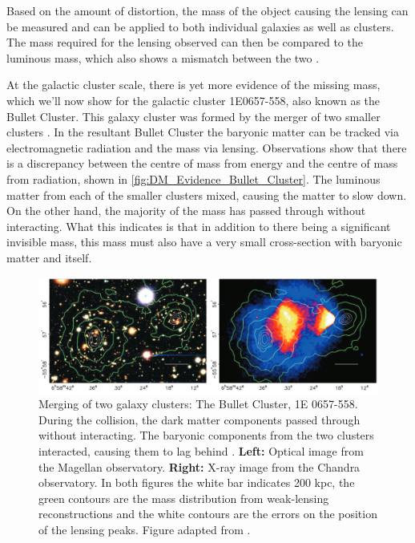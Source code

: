 \par
Based on the amount of distortion, the mass of the object causing the lensing can be measured and can be applied to both individual galaxies as well as clusters.
The mass required for the lensing observed can then be compared to the luminous mass, which also shows a mismatch between the two \cite{History_Of_Dark_Matter_2018_ref}.


\par
At the galactic cluster scale, there is yet more evidence of the missing mass, which we'll now show for the galactic cluster 1E0657-558, also known as the Bullet Cluster.
This galaxy cluster was formed by the merger of two smaller clusters \cite{bullet_cluster_ref}.
In the resultant Bullet Cluster the baryonic matter can be tracked via electromagnetic radiation and the mass via lensing.
Observations show that there is a discrepancy between the centre of mass from energy and the centre of mass from radiation, shown in \autoref{fig:DM_Evidence_Bullet_Cluster}.
The luminous matter from each of the smaller clusters mixed, causing the matter to slow down.
On the other hand, the majority of the mass has passed through without interacting.
What this indicates is that in addition to there being a significant invisible mass, this mass must also have a very small cross-section with baryonic matter and itself.

\begin{figure}%
    \centering
     \includegraphics[width=\textwidth]{Figures/DarkMatterEvidence/bullet_cluster_2.png}
    \caption[Merging of two galaxy cluster, 1E 0657-558]{Merging of two galaxy clusters: The Bullet Cluster, 1E 0657-558.
             During the collision, the dark matter components passed through without interacting.
             The baryonic components from the two clusters interacted, causing them to lag behind .
             \textbf{Left:} Optical image from the Magellan observatory.
             \textbf{Right:} X-ray image from the Chandra observatory.
             In both figures the white bar indicates 200 kpc, the green contours are the mass distribution from weak-lensing reconstructions and the white contours are the errors on the position of the lensing peaks.
             Figure adapted from \cite{bullet_cluster_ref}.}
    \label{fig:DM_Evidence_Bullet_Cluster}
\end{figure}


